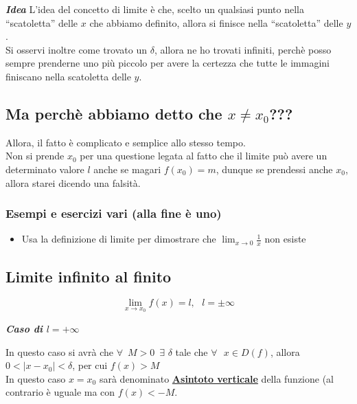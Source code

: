 \documentclass{article}
\theoremstyle{definition}
\newcommand{\virgolette}[1]{``#1''}
\begin{document}
    \textbf{\textit{Idea }}
L'idea del concetto di limite è che, scelto un qualsiasi punto nella \virgolette{scatoletta} delle $x$ che abbiamo definito, allora si finisce nella \virgolette{scatoletta} delle $y$.
\\
Si osservi inoltre come trovato un $\delta$, allora ne ho trovati infiniti, perchè posso sempre prenderne uno più piccolo per avere la certezza che tutte le immagini finiscano nella scatoletta delle $y$.
\subsection{Ma perchè abbiamo detto che $x \neq x_0$???}
Allora, il fatto è complicato e semplice allo stesso tempo.
\\
Non si prende $x_0$ per una questione legata al fatto che il limite può avere un determinato valore $l$ anche se magari $f(x_0)=m$, dunque se prendessi anche $x_0$, allora starei dicendo una falsità.
\subsubsection{Esempi e esercizi vari (alla fine è uno)}
\begin{itemize}
    \item Usa la definizione di limite per dimostrare che $\lim_{x \to 0}\frac{1}{x}$ non esiste
\end{itemize}
\newpage
\subsection{Limite infinito al finito}
\begin{equation}
    \lim_{x \to x_0}f(x)=l, \,\,\,\, l=\pm\infty
\end{equation}
\begin{center}
    \textbf{\textit{Caso di $l=+\infty$}}
\end{center}
In questo caso si avrà che $\forall \,\,\, M>0 \,\,\, \exists \,\, \delta $ tale che $\forall \,\,\,\, x \in D(f)$, allora $0<|x-x_0|<\delta$, per cui $f(x)>M$
\\
In questo caso $x=x_0$ sarà denominato \underline{\textbf{Asintoto verticale}} della funzione (al contrario è uguale ma con $f(x)<-M$.
\end{document}
